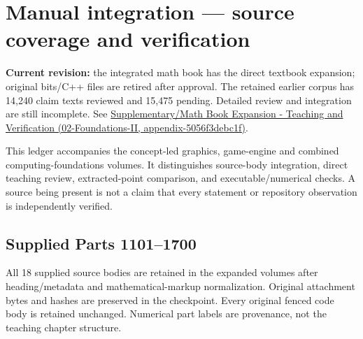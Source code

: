 \hypertarget{appendix-3b67654799a2}{}
\section{Manual integration --- source coverage and verification}\label{appendix-3b67654799a2-manual-integration-source-coverage-and-verification}

\textbf{Current revision:} the integrated math book has the direct textbook expansion; original bits/C++ files are retired after approval. The retained earlier corpus has 14,240 claim texts reviewed and 15,475 pending. Detailed review and integration are still incomplete. See \href{../02-Foundations-II/main.pdf\#nameddest=appendix-5056f3debc1f}{Supplementary/Math Book Expansion - Teaching and Verification (02-Foundations-II, appendix-5056f3debc1f)}.

This ledger accompanies the concept-led graphics, game-engine and combined computing-foundations volumes. It distinguishes source-body integration, direct teaching review, extracted-point comparison, and executable/numerical checks. A source being present is not a claim that every statement or repository observation is independently verified.

\subsection{Supplied Parts 1101--1700}\label{appendix-3b67654799a2-supplied-parts-11011700}

All 18 supplied source bodies are retained in the expanded volumes after heading/metadata and mathematical-markup normalization. Original attachment bytes and hashes are preserved in the checkpoint. Every original fenced code body is retained unchanged. Numerical part labels are provenance, not the teaching chapter structure.

